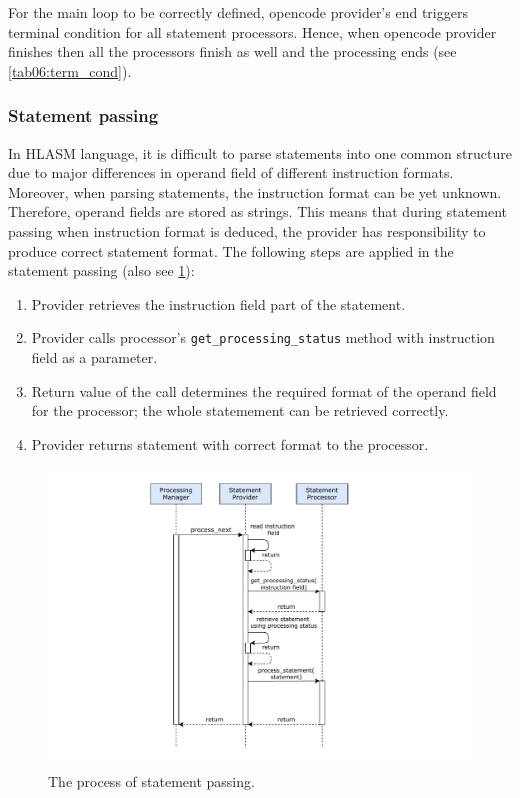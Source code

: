 For the main loop to be correctly defined, opencode provider's end triggers terminal condition for all statement processors. Hence, when opencode provider finishes then all the processors finish as well and the processing ends (see \cref{tab06:term_cond}).

\subsubsection{Statement passing}
\label{lab06:proc_stat}

In HLASM language, it is difficult to parse statements into one common structure due to major differences in operand field of different instruction formats. Moreover, when parsing statements, the instruction format can be yet unknown. Therefore, operand fields are stored as strings. This means that during statement passing when instruction format is deduced, the provider has responsibility to produce correct statement format. The following steps are applied in the statement passing (also see \cref{fig06:process_next}):

\begin{enumerate}
	\item Provider retrieves the instruction field part of the statement.
	\item Provider calls processor's \texttt{get\_processing\_status} method with instruction field as a parameter.
	\item Return value of the call determines the required format of the operand field for the processor; the whole statemement can be retrieved correctly.
	\item Provider returns statement with correct format to the processor. 
\end{enumerate}

\begin{figure}
	\centering
	\includegraphics[width=13cm]{img/process_next}
	\caption{The process of statement passing.}
	\label{fig06:process_next}
\end{figure}


